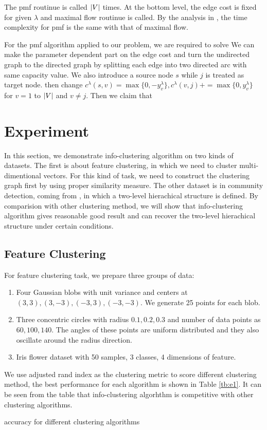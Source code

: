 \documentclass{article}
\begin{document}
The pmf routinue is called $\lvert V\rvert$ times. At the bottom level, the edge cost is fixed for given $\lambda$ and maximal flow routinue is called. By the analysis in \cite{RN17}, the time complexity for pmf is the same with that of maximal flow.

For the pmf algorithm applied to our problem, we are required to solve 
We can make the parameter dependent part on the edge cost and turn the undirected graph to the directed graph by splitting each edge into two directed arc with same capacity value. We also introduce a source
node $s$ while $j$ is treated as target node.  then change
$c^{\lambda}(s,v)=\max\{0, -y^{\lambda}_v\}, c^{\lambda}(v,j) += \max\{0, y^{\lambda}_v\}$ for $ v=1 $ to $\lvert V\rvert$ and $v \neq  j$. Then we claim that



\section{Experiment}\label{sec:experiment}
In this section, we demonstrate info-clustering algorithm on two kinds of datasets. The first is about feature clustering, in which we need to cluster multi-dimentional vectors. For this kind of task, we need to construct the clustering graph first by using proper similarity measure. The other dataset is in community detection, coming from \cite{RN22}, in which a two-level hierachical structure is defined. By comparision with other clustering method, we will show that info-clustering algorithm gives reasonable good result and can recover the two-level hierachical structure under certain conditions. 

\subsection{Feature Clustering}\label{sec:fc}
For feature clustering task, we prepare three groups of data:
\begin{enumerate}
\item Four Gaussian blobs with unit variance and centers at $(3,3), (3,-3), (-3,3), (-3,-3)$.  We generate 25 points for each blob.
\item Three concentric circles with radius $0.1,0.2,0.3$ and number of data points as $60, 100, 140$. The angles of these points are uniform distributed and they also oscillate around the radius direction.
\item Iris flower dataset with 50 samples, 3 classes, 4 dimensions of feature.
\end{enumerate}
We use adjusted rand index as the clustering metric to score different clustering method, the best performance for each algorithm is shown in Table \ref{tb:e1}.  It can be seen from the table that info-clustering algorhthm is competitive with other clustering algorithms.
\begin{table}
\centering
{}
\caption{ accuracy for different clustering algorithms }\label{tb:e1}
\end{table}
\end{document}
